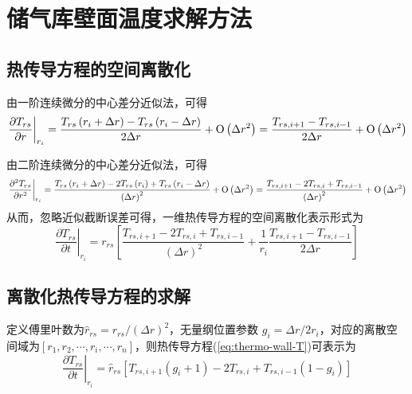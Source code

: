 \chapter{储气库壁面温度求解方法}
\label{cha:air-wall-temp-exp}
\section{热传导方程的空间离散化}

由一阶连续微分的中心差分近似法，可得
\begin{equation}
{\left. {\frac{{\partial {T_{rs}}}}{{\partial r}}} \right|_{{r_i}}} = \frac{{{T_{rs}}\left( {{r_i} + \Delta r} \right) - {T_{rs}}\left( {{r_i} - \Delta r} \right)}}{{2\Delta r}} + {\rm O}\left( {\Delta {r^2}} \right) = \frac{{{T_{rs,i + 1}} - {T_{rs,i - 1}}}}{{2\Delta r}} + {\rm O}\left( {\Delta {r^2}} \right)
\end{equation}

由二阶连续微分的中心差分近似法，可得
\begin{equation}
{\left. {\frac{{{\partial ^2}{T_{rs}}}}{{\partial {r^2}}}} \right|_{{r_i}}} = \frac{{{T_{rs}}\left( {{r_i} + \Delta r} \right) - 2{T_{rs}}\left( {{r_i}} \right) + {T_{rs}}\left( {{r_i} - \Delta r} \right)}}{{{{\left( {\Delta r} \right)}^2}}} + {\rm O}\left( {\Delta {r^2}} \right) = \frac{{{T_{rs,i + 1}} - 2{T_{rs,i}} + {T_{rs,i - 1}}}}{{{{\left( {\Delta r} \right)}^2}}} + {\rm O}\left( {\Delta {r^2}} \right)
\end{equation}
从而，忽略近似截断误差可得，一维热传导方程的空间离散化表示形式为
\begin{equation}
\label{eq:thermo-wall-T}
{\left. {\frac{{\partial {T_{rs}}}}{{\partial t}}} \right|_{{r_i}}} = {r_{rs}}\left[ {\frac{{{T_{rs,i + 1}} - 2{T_{rs,i}} + {T_{rs,i - 1}}}}{{{{\left( {\Delta r} \right)}^2}}} + \frac{1}{{{r_i}}}\frac{{{T_{rs,i + 1}} - {T_{rs,i - 1}}}}{{2\Delta r}}} \right]
\end{equation}

\section{离散化热传导方程的求解}
定义傅里叶数为${\hat r_{rs}} = {r_{rs}}/{\left( {\Delta r} \right)^2}$，无量纲位置参数 ${g_i} = \Delta r/2{r_i}$，对应的离散空间域为$\left[ {{r_1},{r_2}, \cdots ,{r_i}, \cdots ,{r_n}} \right]$，则热传导方程(\ref{eq:thermo-wall-T})可表示为\cite{Model-AA-CAES-10}
\begin{equation}
{\left. {\frac{{\partial {T_{rs}}}}{{\partial t}}} \right|_{{r_i}}} = {\hat r_{rs}}\left[ {{T_{rs,i + 1}}\left( {{g_i} + 1} \right) - 2{T_{rs,i}} + {T_{rs,i - 1}}\left( {1 - {g_i}} \right)} \right]
\end{equation}

